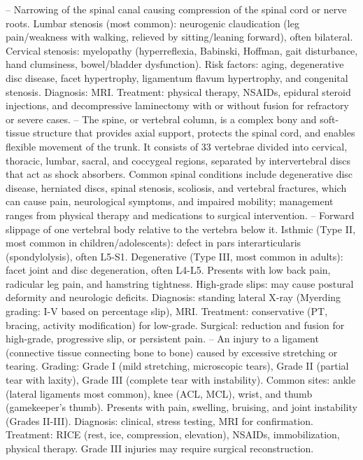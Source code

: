 -- Narrowing of the spinal canal causing compression of the spinal cord or nerve roots. Lumbar stenosis (most common): neurogenic claudication (leg pain/weakness with walking, relieved by sitting/leaning forward), often bilateral. Cervical stenosis: myelopathy (hyperreflexia, Babinski, Hoffman, gait disturbance, hand clumsiness, bowel/bladder dysfunction). Risk factors: aging, degenerative disc disease, facet hypertrophy, ligamentum flavum hypertrophy, and congenital stenosis. Diagnosis: MRI. Treatment: physical therapy, NSAIDs, epidural steroid injections, and decompressive laminectomy with or without fusion for refractory or severe cases.
-- The spine, or vertebral column, is a complex bony and soft-tissue structure that provides axial support, protects the spinal cord, and enables flexible movement of the trunk. It consists of 33 vertebrae divided into cervical, thoracic, lumbar, sacral, and coccygeal regions, separated by intervertebral discs that act as shock absorbers. Common spinal conditions include degenerative disc disease, herniated discs, spinal stenosis, scoliosis, and vertebral fractures, which can cause pain, neurological symptoms, and impaired mobility; management ranges from physical therapy and medications to surgical intervention.
-- Forward slippage of one vertebral body relative to the vertebra below it. Isthmic (Type II, most common in children/adolescents): defect in pars interarticularis (spondylolysis), often L5-S1. Degenerative (Type III, most common in adults): facet joint and disc degeneration, often L4-L5. Presents with low back pain, radicular leg pain, and hamstring tightness. High-grade slips: may cause postural deformity and neurologic deficits. Diagnosis: standing lateral X-ray (Myerding grading: I-V based on percentage slip), MRI. Treatment: conservative (PT, bracing, activity modification) for low-grade. Surgical: reduction and fusion for high-grade, progressive slip, or persistent pain.
-- An injury to a ligament (connective tissue connecting bone to bone) caused by excessive stretching or tearing. Grading: Grade I (mild stretching, microscopic tears), Grade II (partial tear with laxity), Grade III (complete tear with instability). Common sites: ankle (lateral ligaments most common), knee (ACL, MCL), wrist, and thumb (gamekeeper's thumb). Presents with pain, swelling, bruising, and joint instability (Grades II-III). Diagnosis: clinical, stress testing, MRI for confirmation. Treatment: RICE (rest, ice, compression, elevation), NSAIDs, immobilization, physical therapy. Grade III injuries may require surgical reconstruction.
